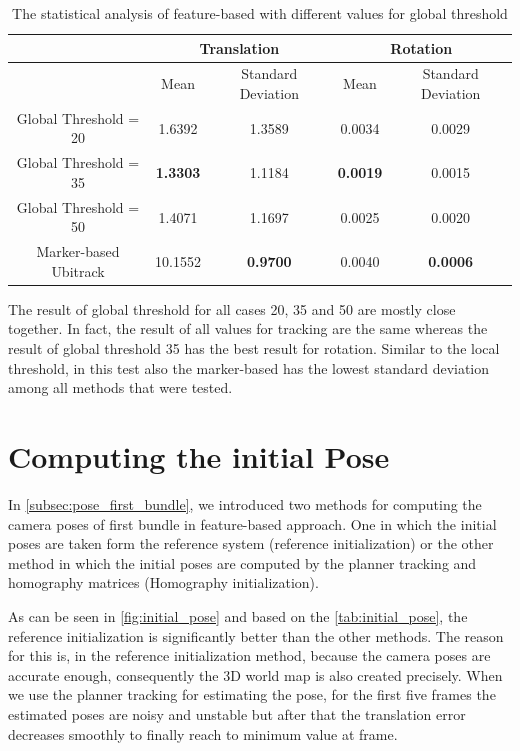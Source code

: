 \begin{table}[H]
\centering
  \begin{tabular}{| c || c | c | c | c |}
      \hline
      & \multicolumn{2}{c|}{Translation} & \multicolumn{2}{c|}{Rotation} \\ \hline
       & Mean & Standard Deviation & Mean & Standard Deviation \\ \hline
      Global Threshold = 20 & 1.6392 & 1.3589 & 0.0034 & 0.0029 \\ \hline
      Global Threshold = 35 & \textbf{1.3303} & 1.1184 & \textbf{0.0019} & 0.0015 \\ \hline
      Global Threshold = 50 & 1.4071 & 1.1697 & 0.0025 & 0.0020 \\ \hline
      Marker-based Ubitrack & 10.1552 & \textbf{0.9700} & 0.0040 & \textbf{0.0006} \\ \hline
  \end{tabular}
  \caption{The statistical analysis of feature-based with different values for global threshold} \label{tab:test_global_threshold}
\end{table}
The result of global threshold for all cases 20, 35 and 50 are mostly close together. In fact, the result of all values for tracking are the same whereas the result of global threshold 35 has the best result for rotation. Similar to the local threshold, in this test also the marker-based has the lowest standard deviation among all methods that were tested.

\section{Computing the initial Pose} \label{sec:initial_pose}
In \autoref{subsec:pose_first_bundle}, we introduced two methods for computing the camera poses of first bundle in feature-based approach. One in which the initial poses are taken form the reference system (reference initialization) or the other method in which the initial poses are computed by the planner tracking and homography matrices (Homography initialization).

As can be seen in \autoref{fig:initial_pose} and based on the \autoref{tab:initial_pose}, the reference initialization is significantly better than the other methods. The reason for this is, in the reference initialization method, because the camera poses are accurate enough, consequently the 3D world map is also created precisely. When we use the planner tracking for estimating the pose, for the first five frames the estimated poses are noisy and unstable but after that the translation error decreases smoothly to finally reach to minimum value at  frame.

